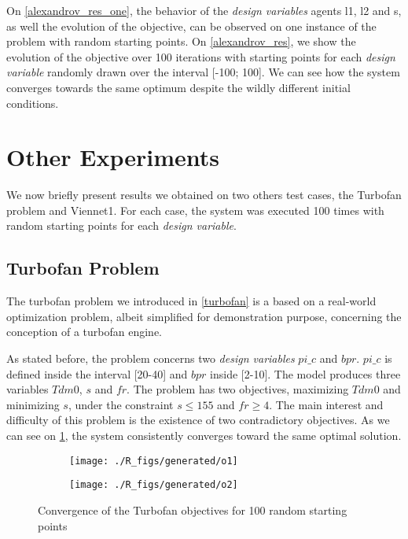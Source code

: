 On \figurename \ref{alexandrov_res_one}, the behavior of the \emph{design variables} agents l1, l2 and s, as well the evolution of the objective, can be observed on one instance of the problem with random starting points. On \figurename \ref{alexandrov_res}, we show the evolution of the objective over 100 iterations with  starting points  for each \emph{design variable} randomly drawn over the interval [-100; 100]. We can see how the system converges towards the same optimum despite the wildly different initial conditions.

\section{Other Experiments}

We now briefly present results we obtained on two others test cases, the Turbofan problem and Viennet1. For each case, the system was executed 100 times with random starting points for each \emph{design variable}.

\subsection{Turbofan Problem}

The turbofan problem we introduced in \figurename \ref{turbofan} is a based on a real-world optimization problem, albeit simplified for demonstration purpose, concerning the conception of a turbofan engine.

As stated before, the problem concerns two \emph{design variables} $pi\_c$ and $bpr$. $pi\_c$ is defined inside the interval [20-40] and $bpr$ inside [2-10]. The model produces three variables $Tdm0$, $s$ and $fr$.
The problem has two objectives, maximizing  $Tdm0$ and minimizing $s$, under the constraint \(s \leq 155\) and \(fr \geq 4\).
The main interest and difficulty of this problem is the existence of two contradictory objectives.
As we can see on \figurename \ref{snecma_res}, the system consistently converges toward the same optimal solution.

\begin{figure}[h]
	\begin{subfigure}[b]{0.49\textwidth}
		\centering
		\texttt{[image: ./R\_figs/generated/o1]}	
	\end{subfigure}
	\hfill%
	\begin{subfigure}[b]{0.49\textwidth}
		\centering
		\texttt{[image: ./R\_figs/generated/o2]}	
	\end{subfigure}
	\caption{Convergence of the Turbofan objectives for 100 random starting points}
	\label{snecma_res}
\end{figure}


